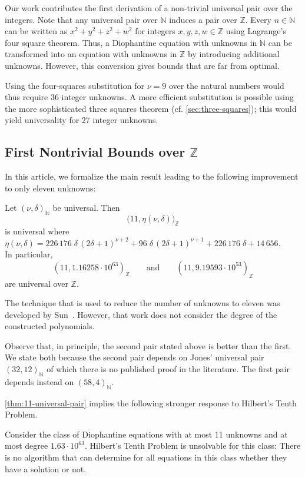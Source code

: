 \documentclass[a4paper,USenglish,cleveref,autoref,thm-restate]{lipics-v2021}
\newcommand{\N}{{\mathbb N}}
\newcommand{\Z}{{\mathbb Z}}
\begin{document}
Our work contributes the first derivation of a non-trivial universal pair over the integers. Note that any universal pair over $\N$ induces a pair over $\Z$. Every $n \in \N$ can be written as $x^2 + y^2 + z^2 + w^2$ for integers $x,y,z,w \in \Z$ using Lagrange's four square theorem. Thus, a Diophantine equation with unknowns in $\N$ can be transformed into an equation with unknowns in $\Z$ by introducing additional unknowns. However, this conversion gives bounds that are far from optimal. 

Using the four-squares substitution for $\nu = 9$ over the natural numbers would thus require 36 integer unknowns. A more efficient substitution is possible using the more sophisticated three squares theorem (cf. \cref{sec:three-squares}); this would yield universality for 27 integer unknowns. 

\subsection{First Nontrivial Bounds over \texorpdfstring{$\Z$}{the Integers}}
In this article, we formalize the main result leading to the following improvement to only eleven unknowns:

\begin{theorem}\label{thm:11-universal-pair}
    Let $(\nu, \delta)_\N$ be universal. Then
        \[ \big(11, \eta(\nu, \delta) \big)_\Z \]
    is universal where $\eta(\nu, \delta) = 226\,176 \; \delta \, (2 \delta +1)^{\nu +2} + 96 \; \delta \, (2 \delta +1)^{\nu +1} + 226\,176 \; \delta +14\,656$. \\
    In particular, 
    \[ (11,1.16258\cdot 10^{63})_\Z \qquad \text{and} \qquad (11, 9.19593 \cdot 10^{53})_\Z \]
    are universal over $\Z$.
\end{theorem}

The technique that is used to reduce the number of unknowns to eleven was developed by Sun~\cite{Sun}. However, that work does not consider the degree of the constructed polynomials.

Observe that, in principle, the second pair stated above is better than the first. We state both because the second pair depends on Jones' universal pair $(32, 12)_\N$ of which there is no published proof in the literature. The first pair depends instead on $(58, 4)_\N$.

\cref{thm:11-universal-pair} implies the following stronger response to Hilbert's Tenth Problem.
\begin{corollary}\label{cor:strong-htp}
    Consider the class of Diophantine equations with at most 11 unknowns and at most degree $1.63 \cdot 10^{63}$. Hilbert's Tenth Problem is unsolvable for this class: There is no algorithm that can determine for all equations in this class whether they have a solution or not. 
\end{corollary}
\end{document}
